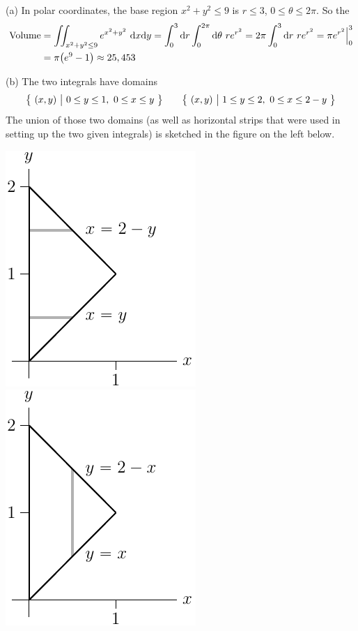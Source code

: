 \begin{solution}
(a) In polar coordinates, the base region $x^2+y^2\le 9$ is $r\le 3$,
$0\le\theta\le 2\pi$. So the
\begin{align*}
\text{Volume}
&=\iint_{x^2+y^2\le 9} e^{x^2+y^2}\ \mathrm{d}x\mathrm{d}y
=\int_0^3 \mathrm{d}r\int_0^{2\pi}\mathrm{d}\theta\ r e^{r^2}
=2\pi\int_0^3\mathrm{d}r\ r e^{r^2}
=\pi e^{r^2}\Big|_0^3 \\
&=\pi\big(e^9-1\big)\approx 25,453
\end{align*}

(b) The two integrals have domains
\begin{align*}
\big\{ \ (x,y)\ \big|\ 0\le y\le 1,\ 0\le x\le y\ \big\}\qquad
\big\{ \ (x,y)\ \big|\ 1\le y\le 2,\ 0\le x\le 2-y\ \big\}
\end{align*}
The union of those two domains (as well as horizontal strips that were used in
setting up the two given integrals) is sketched in the figure on the left below.
\begin{center}
     \includegraphics{fig/OE03AQ5.pdf}\qquad
     \includegraphics{fig/OE03AQ5b.pdf}

\end{center}
\end{solution}
